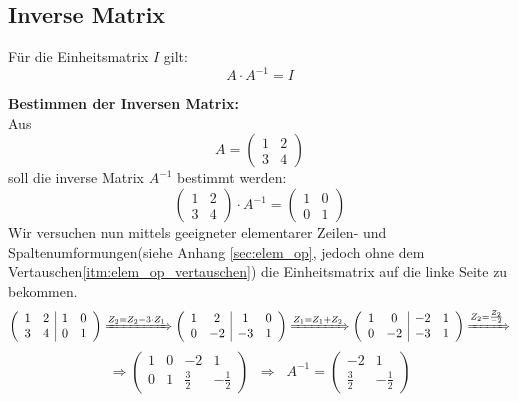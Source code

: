 \subsection{Inverse Matrix}
\begin{definition}
Für die Einheitsmatrix $I$ gilt:
\[A\cdot A^{-1}=I\]
\end{definition}
\begin{bsp} \textbf{Bestimmen der Inversen Matrix:}\\
Aus \[A=\left(\begin{array}{cc}
1 & 2 \\
3 & 4
\end{array}\right)\] 
soll die inverse Matrix $A^{-1}$ bestimmt werden:
\[\left(\begin{array}{cc}
1 & 2 \\
3 & 4
\end{array}\right)\cdot A^{-1}=
\left(\begin{array}{cc}
1 & 0\\
0 & 1
\end{array}\right)\]
Wir versuchen nun mittels geeigneter elementarer Zeilen- und Spaltenumformungen(siehe Anhang \ref{sec:elem_op}, jedoch ohne dem Vertauschen\ref{itm:elem_op_vertauschen}) die Einheitsmatrix auf die linke Seite zu bekommen.
\[\left(\begin{array}{cc|cc}
1 & 2 & 1 & 0\\
3 & 4 & 0 & 1
\end{array}\right)
\xRightarrow{Z_2=Z_2-3\cdot Z_1}
\left(\begin{array}{cc|cc}
1 & 2 & 1 & 0\\
0 & -2 & -3 & 1
\end{array}\right)
\xRightarrow{Z_1=Z_1+Z_2}
\left(\begin{array}{cc|cc}
1 & 0 & -2 & 1\\
0 & -2 & -3 & 1
\end{array}\right)
\xRightarrow{Z_2=\frac{Z_2}{-2}}
\]
\[
\Rightarrow\left(\begin{array}{cc|cc}
1 & 0 & -2 & 1\\
0 & 1 & \frac{3}{2} & -\frac{1}{2}
\end{array}\right)\;\;\Rightarrow\;\;
A^{-1}=\left(\begin{array}{cc}
-2 & 1 \\
\frac{3}{2} & -\frac{1}{2} 
\end{array}\right)
\]

\end{bsp}

